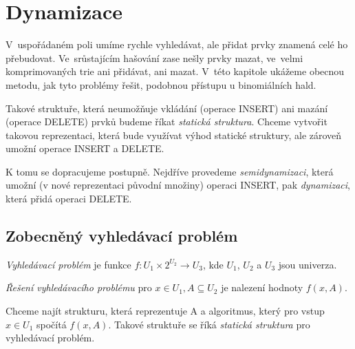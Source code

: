 
\chapter{Dynamizace}

V~uspořádaném poli umíme rychle vyhledávat, ale přidat prvky znamená
celé ho přebudovat. Ve~srůstajícím hašování zase nešly prvky mazat,
ve~velmi komprimovaných trie ani přidávat, ani mazat. V~této kapitole
ukážeme obecnou metodu, jak tyto problémy řešit, podobnou přístupu u
binomiálních hald.
\par
Takové struktuře, která neumožňuje vkládání (operace INSERT) ani mazání 
(operace DELETE) prvků budeme říkat
\emph{statická struktura}. Chceme vytvořit takovou reprezentaci, která
bude využívat výhod statické struktury, ale zároveň umožní operace INSERT
a DELETE.
\par
K tomu se dopracujeme postupně. 
Nejdříve provedeme \emph{semidynamizaci}, 
která umožní (v nové reprezentaci původní množiny) operaci INSERT, 
pak \emph{dynamizaci}, která přidá operaci DELETE. 



\section{Zobecněný vyhledávací problém}

\begin{defn}
\emph{Vyhledávací problém} je funkce $f: U_1 \times 2^{U_2} \to U_3$, kde
$U_1$, $U_2$ a $U_3$ jsou univerza.
\end{defn}
\begin{defn}
\emph{Řešení vyhledávacího problému} pro $x \in U_1, A \subseteq U_2$
je nalezení hodnoty $f(x, A)$.
\end{defn}

\begin{pozn}
Chceme najít strukturu, která reprezentuje A a algoritmus, který pro vstup
$x \in U_1$ spočítá $f(x, A)$. Takové struktuře se říká 
\emph{statická struktura} pro vyhledávací problém.
\end{pozn}

